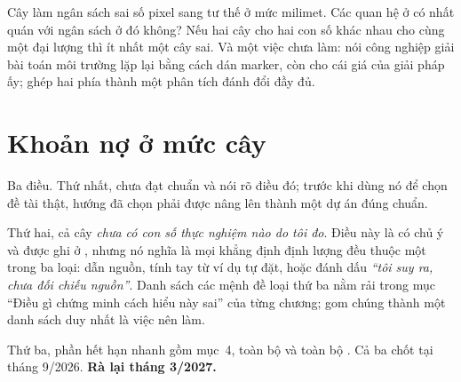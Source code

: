 \documentclass[vslam.tex]{subfiles}
\begin{document}
Cây  làm ngân sách sai số pixel sang tư thế ở mức milimet. Các quan hệ ở  có nhất quán với ngân sách ở đó không? Nếu hai cây cho hai con số khác nhau cho cùng một đại lượng thì ít nhất một cây sai. Và một việc chưa làm:  nói công nghiệp giải bài toán môi trường lặp lại bằng cách dán marker, còn  cho cái giá của giải pháp ấy; ghép hai phía thành một phân tích đánh đổi đầy đủ.

\section*{Khoản nợ ở mức cây}

Ba điều. Thứ nhất,  chưa đạt chuẩn  và nói rõ điều đó; trước khi dùng nó để chọn đề tài thật, hướng đã chọn phải được nâng lên thành một dự án  đúng chuẩn.

Thứ hai, cả cây \emph{chưa có con số thực nghiệm nào do tôi đo}. Điều này là có chủ ý và được ghi ở , nhưng nó nghĩa là mọi khẳng định định lượng đều thuộc một trong ba loại: dẫn nguồn, tính tay từ ví dụ tự đặt, hoặc đánh dấu \emph{``tôi suy ra, chưa đối chiếu nguồn''}. Danh sách các mệnh đề loại thứ ba nằm rải trong mục ``Điều gì chứng minh cách hiểu này sai'' của từng chương; gom chúng thành một danh sách duy nhất là việc nên làm.

Thứ ba, phần hết hạn nhanh gồm  mục~4, toàn bộ  và toàn bộ . Cả ba chốt tại tháng 9/2026. \textbf{Rà lại tháng 3/2027.}
\end{document}
